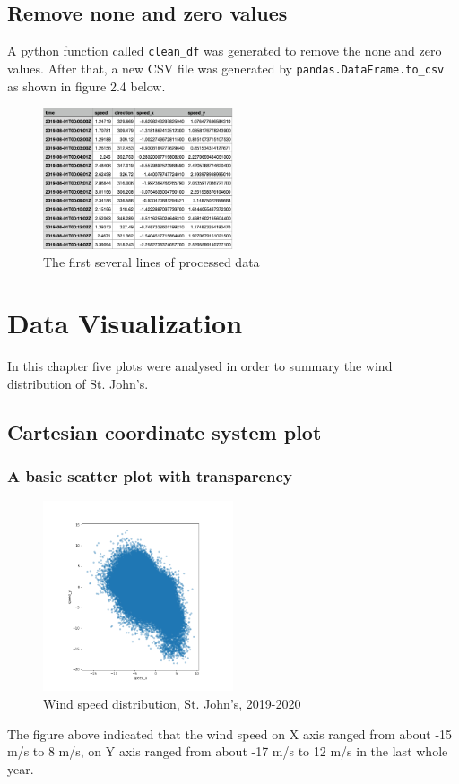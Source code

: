 \documentclass[10pt]{report}
\begin{document}
\section{Remove none and zero values}
A python function called \texttt{clean\_df} was generated to remove the none and zero values. After that, a new CSV file was generated by \texttt{pandas.DataFrame.to\_csv} as shown in figure 2.4 below.
\begin{figure}[h!]
    \centering
    \includegraphics[width=0.50\textwidth]{images/processed_data.png}
    \caption{The first several lines of processed data}
    \label{fig: PaleBlueDot}    
\end{figure}

 \chapter{Data Visualization}
 In this chapter five plots were analysed in order to summary the wind distribution of St. John's.

\section{Cartesian coordinate system plot}

\subsection{A basic scatter plot with transparency}
\begin{figure}[h!]
    \centering
    \includegraphics[width=0.50\textwidth]{images/figure1.png}
    \caption{Wind speed distribution, St. John's, 2019-2020}
    \label{fig: PaleBlueDot}    
\end{figure}
The figure above indicated that the wind speed on X axis ranged from about -15 m/s to 8 m/s, on Y axis ranged from about -17 m/s to 12 m/s in the last whole year.
\end{document}
